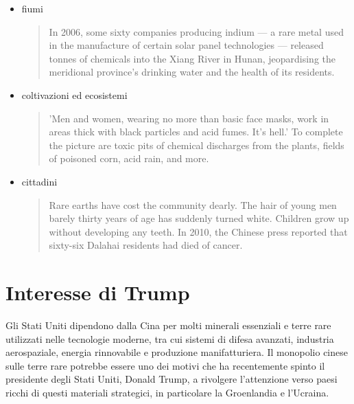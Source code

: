 \documentclass[12pt,a4paper,oneside]{book}
\begin{document}
\begin{itemize}
\item fiumi
\begin{quote}
\small
In 2006, some sixty companies producing indium — a rare metal used in the manufacture of certain solar panel technologies — released tonnes of chemicals into the Xiang River in Hunan, jeopardising the meridional province's drinking water and the health of its residents. \citep[p. 25]{pitron2020rare}
\end{quote}

\item coltivazioni ed ecosistemi
\begin{quote}
\small
'Men and women, wearing no more than basic face masks, work in areas thick with black particles and acid fumes. It's hell.' To complete the picture are toxic pits of chemical discharges from the plants, fields of poisoned corn, acid rain, and more. \citep[p. 26]{pitron2020rare}
\end{quote}

\item cittadini
\begin{quote}
\small
Rare earths have cost the community dearly. The hair of young men barely thirty years of age has suddenly turned white. Children grow up without developing any teeth. In 2010, the Chinese press reported that sixty-six Dalahai residents had died of cancer. \citep[p. 29]{pitron2020rare}
\end{quote}
    
\end{itemize}

\section{Interesse di Trump}

Gli Stati Uniti dipendono dalla Cina per molti minerali essenziali e terre rare utilizzati nelle tecnologie moderne, tra cui sistemi di difesa avanzati, industria aerospaziale, energia rinnovabile e produzione manifatturiera.
Il monopolio cinese sulle terre rare potrebbe essere uno dei motivi che ha recentemente spinto il presidente degli Stati Uniti, Donald Trump, a rivolgere l'attenzione verso paesi ricchi di questi materiali strategici, in particolare la Groenlandia e l'Ucraina.
\end{document}
